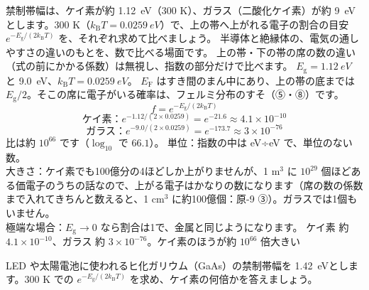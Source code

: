 \label{ph:原-8:ex1}
\begin{phreidai}
禁制帯幅は、ケイ素が約 \qty{1.12}{eV}（300 K）、ガラス（二酸化ケイ素）が約 \qty{9}{eV}とします。300 K（$k_{\mathrm B}T=\qty{0.0259}{eV}$）で、上の帯へ上がれる電子の割合の目安 $e^{-E_{\mathrm g}/(2k_{\mathrm B}T)}$ を、それぞれ求めて比べましょう。
\phbamen
半導体と絶縁体の、電気の通しやすさの違いのもとを、数で比べる場面です。
\phmushi
上の帯・下の帯の席の数の違い（式の前にかかる係数）は無視し、指数の部分だけで比べます。
\phzu
$E_{\mathrm g}=\qty{1.12}{eV}$ と \qty{9.0}{eV}、$k_{\mathrm B}T=\qty{0.0259}{eV}$。
\phriyu
$E_{\mathrm F}$ はすき間のまん中にあり、上の帯の底までは $E_{\mathrm g}/2$。そこの席に電子がいる確率は、フェルミ分布のすそ（⑤・⑧）です。
\phtateru
\[ f=e^{-E_{\mathrm g}/(2k_{\mathrm B}T)} \]
\phtoku
\[ \text{ケイ素：}e^{-1.12/(2\times0.0259)}=e^{-21.6}\approx4.1\times10^{-10} \]
\[ \text{ガラス：}e^{-9.0/(2\times0.0259)}=e^{-173.7}\approx3\times10^{-76} \]
比は約 $10^{66}$ です（$\log_{10}$ で $66.1$）。
\phtashikame
単位：指数の中は eV÷eV で、単位のない数。\\
大きさ：ケイ素でも100億分の4ほどしか上がりませんが、1 m$^3$ に $10^{29}$ 個ほどある価電子のうちの話なので、上がる電子はかなりの数になります（席の数の係数まで入れてきちんと数えると、1 cm$^3$ に約100億個：原-9 ③）。ガラスでは1個もいません。\\
極端な場合：$E_{\mathrm g}\to0$ なら割合は1で、金属と同じようになります。
\kotae ケイ素 約 $4.1\times10^{-10}$、ガラス 約 $3\times10^{-76}$。ケイ素のほうが約 $10^{66}$ 倍大きい
\end{phreidai}
\begin{jibun}
LED や太陽電池に使われるヒ化ガリウム（GaAs）の禁制帯幅を \qty{1.42}{eV}とします。300 K での $e^{-E_{\mathrm g}/(2k_{\mathrm B}T)}$ を求め、ケイ素の何倍かを答えましょう。
\end{jibun}


